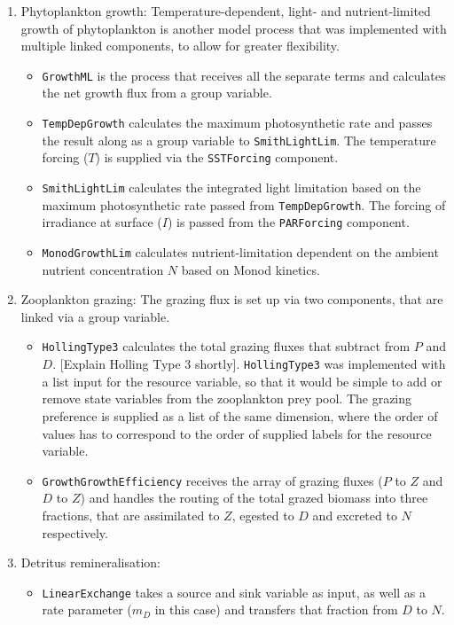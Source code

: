 \documentclass[journal abbreviation, manuscript]{copernicus}
\begin{document}
\begin{enumerate}
    \item Phytoplankton growth: Temperature-dependent, light- and nutrient-limited growth of phytoplankton is another model process that was implemented with multiple linked components, to allow for greater flexibility.
    \begin{itemize}    
        \item \texttt{GrowthML} is the process that receives all the separate terms and calculates the net growth flux from a group variable. 
        \item \texttt{TempDepGrowth} calculates the maximum photosynthetic rate and passes the result along as a group variable to \texttt{SmithLightLim}. The temperature forcing ($T$) is supplied via the \texttt{SSTForcing} component.
        \item \texttt{SmithLightLim} calculates the integrated light limitation based on the maximum photosynthetic rate passed from \texttt{TempDepGrowth}. The forcing of irradiance at surface ($I$) is passed from the \texttt{PARForcing} component.
        \item \texttt{MonodGrowthLim} calculates nutrient-limitation dependent on the ambient nutrient concentration $N$ based on Monod kinetics. 
    \end{itemize}
    
    \item Zooplankton grazing: The grazing flux is set up via two components, that are linked via a group variable.
    \begin{itemize}    
        \item \texttt{HollingType3} calculates the total grazing fluxes that subtract from $P$ and $D$. [Explain Holling Type 3 shortly]. \texttt{HollingType3} was implemented with a list input for the resource variable, so that it would be simple to add or remove state variables from the zooplankton prey pool. The grazing preference is supplied as a list of the same dimension, where the order of values has to correspond to the order of supplied labels for the resource variable. 
        \item \texttt{GrowthGrowthEfficiency} receives the array of grazing fluxes ($P$ to $Z$ and $D$ to $Z$) and handles the routing of the total grazed biomass into three fractions, that are assimilated to $Z$, egested to $D$ and excreted to $N$ respectively.
    \end{itemize}
    
    \item Detritus remineralisation:
    \begin{itemize}
        \item \texttt{LinearExchange} takes a source and sink variable as input, as well as a rate parameter ($m_D$ in this case) and transfers that fraction from $D$ to $N$.
    \end{itemize}
    

\end{enumerate}
\end{document}
